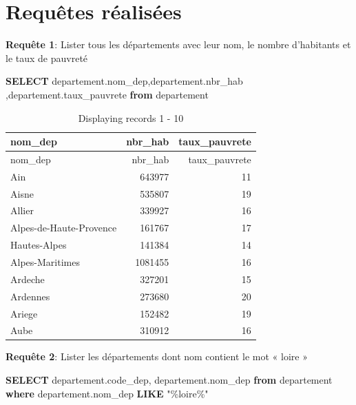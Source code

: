 \documentclass[mstat,12pt]{unswthesis}
\newenvironment{Shaded}{\begin{snugshade}}{\end{snugshade}}
\newcommand{\KeywordTok}[1]{\textcolor[rgb]{0.13,0.29,0.53}{\textbf{#1}}}
\newcommand{\NormalTok}[1]{#1}
\newcommand{\OtherTok}[1]{\textcolor[rgb]{0.56,0.35,0.01}{#1}}
\begin{document}
\bigskip

\section{Requêtes réalisées}\label{requuxeates-ruxe9alisuxe9es}

\textbf{Requête 1}: Lister tous les départements avec leur nom, le
nombre d'habitants et le taux de pauvreté

\begin{Shaded}
\begin{Highlighting}[]
\KeywordTok{SELECT}\NormalTok{ departement.nom\_dep,departement.nbr\_hab ,departement.taux\_pauvrete}
\KeywordTok{from}\NormalTok{ departement}
\end{Highlighting}
\end{Shaded}

\begin{longtable}[]{@{}lrr@{}}
\caption{Displaying records 1 - 10}\tabularnewline
\toprule\noalign{}
nom\_dep & nbr\_hab & taux\_pauvrete \\
\midrule\noalign{}
\endfirsthead
\toprule\noalign{}
nom\_dep & nbr\_hab & taux\_pauvrete \\
\midrule\noalign{}
\endhead
\bottomrule\noalign{}
\endlastfoot
Ain & 643977 & 11 \\
Aisne & 535807 & 19 \\
Allier & 339927 & 16 \\
Alpes-de-Haute-Provence & 161767 & 17 \\
Hautes-Alpes & 141384 & 14 \\
Alpes-Maritimes & 1081455 & 16 \\
Ardeche & 327201 & 15 \\
Ardennes & 273680 & 20 \\
Ariege & 152482 & 19 \\
Aube & 310912 & 16 \\
\end{longtable}

\medskip

\textbf{Requête 2}: Lister les départements dont nom contient le mot «
loire »

\begin{Shaded}
\begin{Highlighting}[]
\KeywordTok{SELECT}\NormalTok{ departement.code\_dep, departement.nom\_dep}
\KeywordTok{from}\NormalTok{ departement}
\KeywordTok{where}\NormalTok{ departement.nom\_dep }\KeywordTok{LIKE} \OtherTok{"\%loire\%"}
\end{Highlighting}
\end{Shaded}
\end{document}
